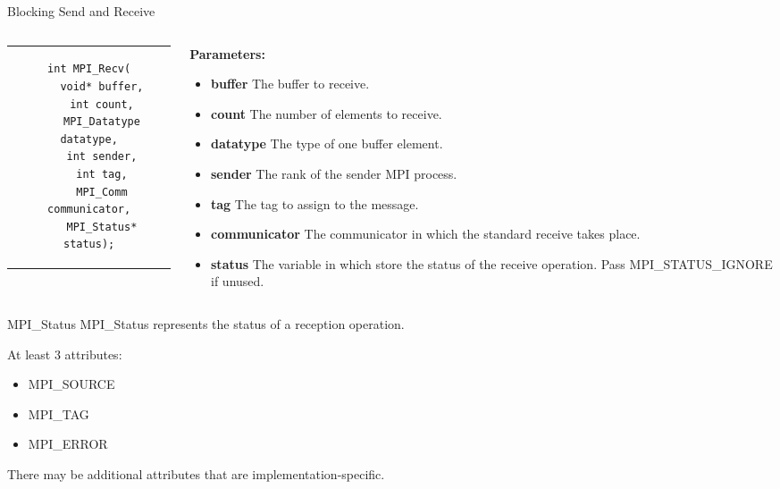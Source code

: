 \begin{frame}[fragile]{Blocking Send and Receive}
\begin{columns}
    
\begin{column}{.4\textwidth}
\begin{tabular}{c}
    \begin{verbatim}
int MPI_Recv(
    void* buffer,
    int count,
    MPI_Datatype datatype,
    int sender,
    int tag,
    MPI_Comm communicator,
    MPI_Status* status);
      \end{verbatim}
\end{tabular}
\end{column}

\begin{column}{.6\textwidth}
\textbf{\large Parameters:}
{\footnotesize
\begin{itemize}
    \item \textbf{buffer} The buffer to receive.

    \item \textbf{count} The number of elements to receive.

    \item \textbf{datatype} The type of one buffer element.

    \item \textbf{sender} The rank of the sender MPI process.

    \item \textbf{tag} The tag to assign to the message.

    \item \textbf{communicator} The communicator in which the standard receive takes place.

    \item \textbf{status} The variable in which store the status of the receive operation. Pass MPI\_STATUS\_IGNORE if unused.
\end{itemize}
}
\end{column}
\end{columns}
\end{frame}

\begin{frame}{MPI\_Status}
    MPI\_Status represents the status of a reception operation.

    At least 3 attributes: 
    \begin{itemize}
        \item MPI\_SOURCE
        \item MPI\_TAG
        \item MPI\_ERROR
    \end{itemize}

    There may be additional attributes that are implementation-specific.
\end{frame}

